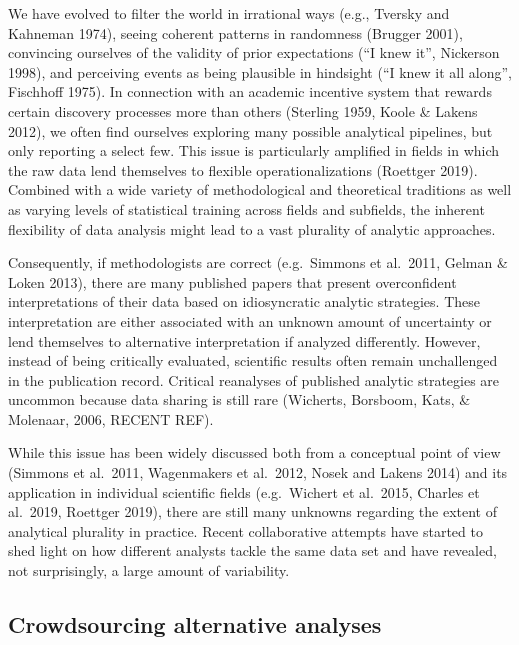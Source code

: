 \documentclass[
  english,
  man]{apa6}
\begin{document}
We have evolved to filter the world in irrational ways (e.g., Tversky and Kahneman 1974), seeing coherent patterns in randomness (Brugger 2001), convincing ourselves of the validity of prior expectations (\enquote{I knew it}, Nickerson 1998), and perceiving events as being plausible in hindsight (\enquote{I knew it all along}, Fischhoff 1975).
In connection with an academic incentive system that rewards certain discovery processes more than others (Sterling 1959, Koole \& Lakens 2012), we often find ourselves exploring many possible analytical pipelines, but only reporting a select few.
This issue is particularly amplified in fields in which the raw data lend themselves to flexible operationalizations (Roettger 2019).
Combined with a wide variety of methodological and theoretical traditions as well as varying levels of statistical training across fields and subfields, the inherent flexibility of data analysis might lead to a vast plurality of analytic approaches.

Consequently, if methodologists are correct (e.g.~Simmons et al.~2011, Gelman \& Loken 2013), there are many published papers that present overconfident interpretations of their data based on idiosyncratic analytic strategies.
These interpretation are either associated with an unknown amount of uncertainty or lend themselves to alternative interpretation if analyzed differently.
However, instead of being critically evaluated, scientific results often remain unchallenged in the publication record.
Critical reanalyses of published analytic strategies are uncommon because data sharing is still rare (Wicherts, Borsboom, Kats, \& Molenaar, 2006, RECENT REF).

While this issue has been widely discussed both from a conceptual point of view (Simmons et al.~2011, Wagenmakers et al.~2012, Nosek and Lakens 2014) and its application in individual scientific fields (e.g.~Wichert et al.~2015, Charles et al.~2019, Roettger 2019), there are still many unknowns regarding the extent of analytical plurality in practice.
Recent collaborative attempts have started to shed light on how different analysts tackle the same data set and have revealed, not surprisingly, a large amount of variability.

\hypertarget{crowdsourcing-alternative-analyses}{%
\subsection{Crowdsourcing alternative analyses}\label{crowdsourcing-alternative-analyses}}
\end{document}
